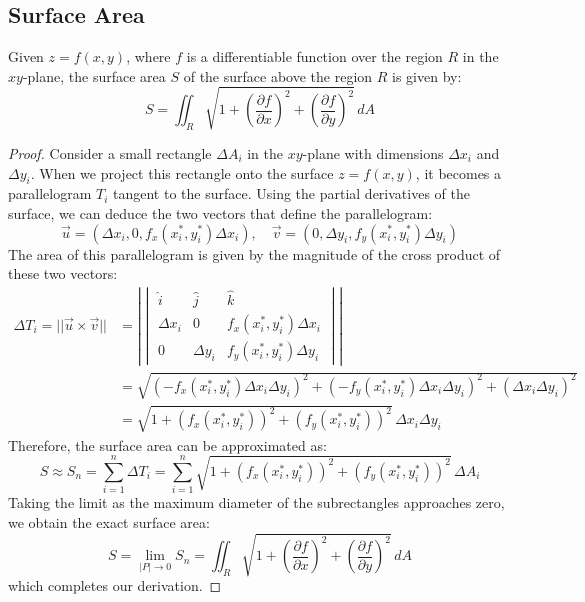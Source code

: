 \documentclass[11pt]{report}
\begin{document}
\subsection{Surface Area}
\begin{theorem}
    Given $z=f(x,y)$, where $f$ is a differentiable function over the region $R$ in the $xy$-plane, the surface area $S$ of the surface above the region $R$ is given by:
    \begin{equation}
        S = \iint_R \sqrt{1 + \left( \frac{\partial f}{\partial x} \right)^2 + \left( \frac{\partial f}{\partial y} \right)^2} \, dA
    \end{equation}
\end{theorem}
\begin{proof}
    Consider a small rectangle $\Delta A_i$ in the $xy$-plane with dimensions $\Delta x_i$ and $\Delta y_i$. When we project this rectangle onto the surface $z = f(x,y)$, it becomes a parallelogram $T_i$ tangent to the surface. Using the partial derivatives of the surface, we can deduce the two vectors that define the parallelogram:
    $$
        \vec{u} = \left( \Delta x_i, 0, f_x(x_i^*, y_i^*) \Delta x_i \right), \quad \vec{v} = \left( 0, \Delta y_i, f_y(x_i^*, y_i^*) \Delta y_i \right)
    $$
    The area of this parallelogram is given by the magnitude of the cross product of these two vectors:
    \begin{align*}
        \Delta T_i = ||\vec{u} \times \vec{v}|| &= \left|\begin{vmatrix}
        \hat{i} & \hat{j} & \hat{k} \\
        \Delta x_i & 0 & f_x(x_i^*, y_i^*) \Delta x_i \\
        0 & \Delta y_i & f_y(x_i^*, y_i^*) \Delta y_i
        \end{vmatrix}\right| \\
        &= \sqrt{( -f_x(x_i^*, y_i^*) \Delta x_i \Delta y_i )^2 + ( -f_y(x_i^*, y_i^*) \Delta x_i \Delta y_i )^2 + (\Delta x_i \Delta y_i)^2} \\
        &= \sqrt{1 + (f_x(x_i^*, y_i^*))^2 + (f_y(x_i^*, y_i^*))^2} \, \Delta x_i \Delta y_i
    \end{align*}
    Therefore, the surface area can be approximated as:
    $$
        S \approx S_n = \sum_{i=1}^n \Delta T_i = \sum_{i=1}^n \sqrt{1 + (f_x(x_i^*, y_i^*))^2 + (f_y(x_i^*, y_i^*))^2} \, \Delta A_i
    $$
    Taking the limit as the maximum diameter of the subrectangles approaches zero, we obtain the exact surface area:
    $$
        S = \lim_{|P| \to 0} S_n =\iint_R \sqrt{1 + \left( \frac{\partial f}{\partial x} \right)^2 + \left( \frac{\partial f}{\partial y} \right)^2} \, dA
    $$
    which completes our derivation.
\end{proof}
\end{document}
